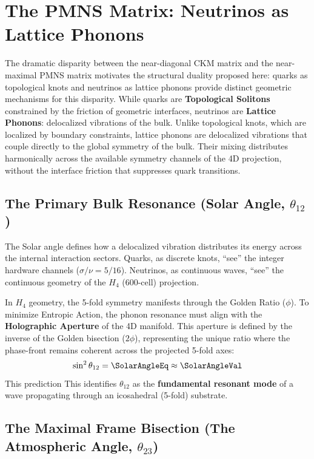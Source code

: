 \section{The PMNS Matrix: Neutrinos as Lattice Phonons}

The dramatic disparity between the near-diagonal CKM matrix and the near-maximal PMNS matrix motivates the structural duality proposed here: quarks as topological knots and neutrinos as lattice phonons provide distinct geometric mechanisms for this disparity. While quarks are \textbf{Topological Solitons} constrained by the friction of geometric interfaces, neutrinos are \textbf{Lattice Phonons}: delocalized vibrations of the bulk. Unlike topological knots, which are localized by boundary constraints, lattice phonons are delocalized vibrations that couple directly to the global symmetry of the bulk. Their mixing distributes harmonically across the available symmetry channels of the 4D projection, without the interface friction that suppresses quark transitions.


\subsection{The Primary Bulk Resonance (Solar Angle, \texorpdfstring{$\theta_{12}$}{theta 12})}
The Solar angle defines how a delocalized vibration distributes its energy across the internal interaction sectors. Quarks, as discrete knots, ``see'' the integer hardware channels ($\sigma/\nu = 5/16$). Neutrinos, as continuous waves, ``see'' the continuous geometry of the $H_4$ (600-cell) projection.

In $H_4$ geometry, the 5-fold symmetry manifests through the Golden Ratio ($\phi$). To minimize Entropic Action, the phonon resonance must align with the \textbf{Holographic Aperture} of the 4D manifold. This aperture is defined by the inverse of the Golden bisection ($2\phi$), representing the unique ratio where the phase-front remains coherent across the projected 5-fold axes:
\begin{equation}
    \sin^2 \theta_{12} = \SolarAngleEq \approx \mathbf{\SolarAngleVal}
\end{equation}
This prediction \SolarAngleAccText This identifies $\theta_{12}$ as the \textbf{fundamental resonant mode} of a wave propagating through an icosahedral (5-fold) substrate.

\subsection{The Maximal Frame Bisection (The Atmospheric Angle, \texorpdfstring{$\theta_{23}$}{theta 23})}


